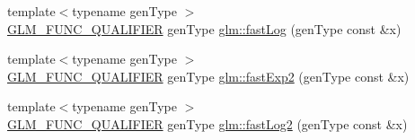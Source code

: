 \begin{DoxyCompactItemize}
\item 
{\footnotesize template$<$typename gen\+Type $>$ }\\\hyperlink{setup_8hpp_a33fdea6f91c5f834105f7415e2a64407}{G\+L\+M\+\_\+\+F\+U\+N\+C\+\_\+\+Q\+U\+A\+L\+I\+F\+I\+ER} gen\+Type \hyperlink{namespaceglm_a8d28d8da7024cc0a18d156d049a82ce8}{glm\+::fast\+Log} (gen\+Type const \&x)
\item 
{\footnotesize template$<$typename gen\+Type $>$ }\\\hyperlink{setup_8hpp_a33fdea6f91c5f834105f7415e2a64407}{G\+L\+M\+\_\+\+F\+U\+N\+C\+\_\+\+Q\+U\+A\+L\+I\+F\+I\+ER} gen\+Type \hyperlink{namespaceglm_a1c48964bb8d608e6ae476f68a31a6a36}{glm\+::fast\+Exp2} (gen\+Type const \&x)
\item 
{\footnotesize template$<$typename gen\+Type $>$ }\\\hyperlink{setup_8hpp_a33fdea6f91c5f834105f7415e2a64407}{G\+L\+M\+\_\+\+F\+U\+N\+C\+\_\+\+Q\+U\+A\+L\+I\+F\+I\+ER} gen\+Type \hyperlink{namespaceglm_ae1503280ca86994a0271217cb09335d6}{glm\+::fast\+Log2} (gen\+Type const \&x)
\end{DoxyCompactItemize}

